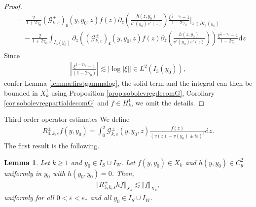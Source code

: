 \documentclass[11pt,reqno]{amsproc}
\makeatletter
\renewcommand\subsection{\@startsection{subsection}{2}%
\normalparindent{.5\linespacing\@plus.7\linespacing}{-.5em}
{\normalfont\bfseries}}
\newtheorem{lemma}[proposition]{Lemma}
\theoremstyle{definition}
\numberwithin{equation}{section}
\newcommand{\G}{{\mathcal{G}}}
\newcommand{\s}{{\mathsf{s}}}
\renewcommand{\d}{\mathrm{d}}
\newcommand{\ep}{\varepsilon}
\makeatother
\begin{document}
\begin{proof}
\begin{align*}
&= \frac{2}{1+2\gamma_0}\left( \G_{k,\ep}^\pm \right)_\s(y,y_0,z) f(z)   \partial_z \left( \frac{h(z,y_0)}{v'(y_0)v'(z)} \right) \frac{\xi^{\frac12-\gamma_0}-1}{1-2\gamma_0}\Big|_{z\in \partial I_3(y_0)} \\
&\quad - \frac{2}{1+2\gamma_0}\int_{I_3(y_0)} \partial_z \left( \left( \G_{k,\ep}^\pm \right)_\s(y,y_0,z) f(z)   \partial_z \left( \frac{h(z,y_0)}{v'(y_0)v'(z)} \right) \right) \frac{\xi^{\frac12-\gamma_0}-1}{1-2\gamma_0}\d z \\
\end{align*}
Since
\begin{align*}
\left| \frac{\xi^{1-2\gamma_0}-1}{(1-2\gamma_0)} \right| \lesssim |\log|\xi||\in L^2(I_3(y_0)),
\end{align*}
confer Lemma \ref{lemma:firstgammalog}, the solid term and the integral can then be bounded in $X_k^1$ using Proposition \ref{prop:sobolevregdecomG}, Corollary \ref{cor:sobolevregpartialdecomG} and $f\in H^1_k$, we omit the details.
\end{proof}




\subsection{Third order operator estimates}
We define
\begin{align*}
R_{3,k,\ep}^\pm f(y,y_0) = \int_0^2 \G_{k,\ep}^\pm(y,y_0,z) \frac{f(z)}{(v(z) - v(y_0) \pm i\ep)^3} \d z.
\end{align*}
The first result is the following.
\begin{lemma}\label{lemma:R3mapsC1XktoXk}
Let $k\geq 1$ and $y_0\in I_S\cup I_W$. Let $f(y,y_0)\in X_k$ and $h(y,y_0)\in C^2_y$ uniformly in $y_0$ with $h(y_0,y_0) = 0$. Then,
\begin{align*}
\Vert R_{3,k,\ep}^\pm hf \Vert_{X_k}\lesssim  \Vert f \Vert_{X_k},
\end{align*}
uniformly for all $0<\ep<\ep_*$ and all $y_0\in I_S\cup I_W$. 
\end{lemma}
\end{document}
